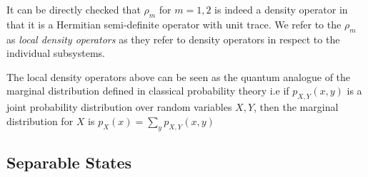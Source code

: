 It can be directly checked that $\rho_m$ for $m = 1,2$ is indeed a density operator in that it is a Hermitian semi-definite operator with unit trace. We refer to the $\rho_m$ as \textit{local density operators} as they refer to density operators in respect to the individual subsystems.

The local density operators above can be seen as the quantum analogue of the marginal distribution defined in classical probability theory i.e if $p_{X,Y}(x,y)$ is a joint probability distribution over random variables $X,Y$, then the marginal distribution for $X$ is
$p_X(x) = \sum_{y} p_{X,Y}(x,y)$


\subsection{Separable States}
